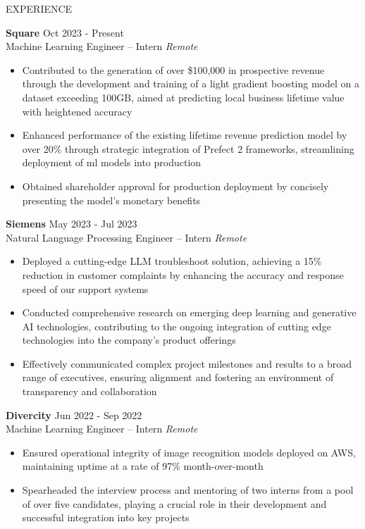 \documentclass{resume} %
\begin{document}
\begin{rSection}{EXPERIENCE}

    \textbf{Square} \hfill Oct 2023 - Present\\
    Machine Learning Engineer -- Intern \hfill \textit{Remote}
     \begin{itemize}
        \itemsep -3pt {} 
        \item Contributed to the generation of over \$100,000 in prospective revenue through the development and training of a light gradient boosting model on a dataset exceeding 100GB, aimed at predicting local business lifetime value with heightened accuracy
        \item Enhanced performance of the existing lifetime revenue prediction model by over 20\% through strategic integration of Prefect 2 frameworks, streamlining deployment of ml models into production
        \item Obtained shareholder approval for production deployment by concisely presenting the model's monetary benefits
     \end{itemize}
     
    \textbf{Siemens} \hfill May 2023 - Jul 2023\\
    Natural Language Processing Engineer -- Intern \hfill \textit{Remote}
     \begin{itemize}
        \itemsep -3pt {} 
        \item Deployed a cutting-edge LLM troubleshoot solution, achieving a 15\% reduction in customer complaints by enhancing the accuracy and response speed of our support systems
        \item Conducted comprehensive research on emerging deep learning and generative AI technologies, contributing to the ongoing integration of cutting edge technologies into the company's product offerings
        \item Effectively communicated complex project milestones and results to a broad range of executives, ensuring alignment and fostering an environment of transparency and collaboration
     \end{itemize}
    
    \textbf{Divercity} \hfill Jun 2022 - Sep 2022\\
    Machine Learning Engineer -- Intern \hfill \textit{Remote}
     \begin{itemize}
        \itemsep -3pt {} 
        \item Ensured operational integrity of image recognition models deployed on AWS, maintaining uptime at a rate of 97\% month-over-month
        \item Spearheaded the interview process and mentoring of two interns from a pool of over five candidates, playing a crucial role in their development and successful integration into key projects
     \end{itemize}
    
    \end{rSection}
    
\end{document}
